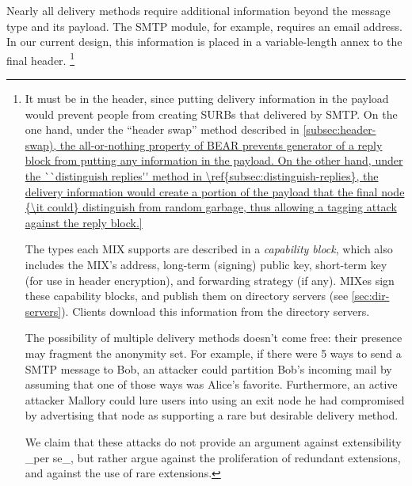 \documentclass{llncs}
\begin{document}
Nearly all delivery methods require additional information beyond the
message type and its payload.  The SMTP module, for example, requires
an email address.  In our current design, this information is placed
in a variable-length annex to the final header.  \footnote{It must be
in the header, since putting delivery information in the payload would
prevent people from creating SURBs that delivered by SMTP.  On the one
hand, under the ``header swap'' method described in
\ref{subsec:header-swap), the all-or-nothing property of BEAR prevents
generator of a reply block from putting any information in the
payload.  On the other hand, under the ``distinguish replies'' method
in \ref{subsec:distinguish-replies}, the delivery information would
create a portion of the payload that the final node {\it could}
distinguish from random garbage, thus allowing a tagging attack
against the reply block.}
%

The types each MIX supports are described in a \emph{capability
block}, which also includes the MIX's address, long-term (signing)
public key, short-term key (for use in header encryption), and
forwarding strategy (if any).  MIXes sign these capability blocks, and
publish them on directory servers (see \ref{sec:dir-servers}).
Clients download this information from the directory servers.


The possibility of multiple delivery methods doesn't come free: their
presence may fragment the anonymity set.  For example, if there were 5
ways to send a SMTP message to Bob, an attacker could partition Bob's
incoming mail by assuming that one of those ways was Alice's favorite.
Furthermore, an active attacker Mallory could lure users into using an
exit node he had compromised by advertising that node as supporting a
rare but desirable delivery method.

We claim that these attacks do not provide an argument against
extensibility _per se_, but rather argue against the proliferation
of redundant extensions, and against the use of rare extensions.  

}
\end{document}
